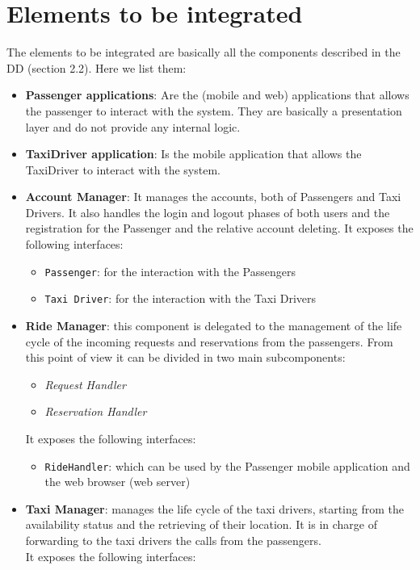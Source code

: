 \section{Elements to be integrated}
The elements to be integrated are basically all the components described in the DD (section 2.2). Here we list them:
\begin{itemize}
	\item \textbf{Passenger applications}: Are the (mobile and web) applications that allows the passenger to interact with the system. They are basically a presentation layer and do not provide any internal logic.
	\item \textbf{TaxiDriver application}: Is the mobile application that allows the TaxiDriver to interact with the system.
	\item \textbf{Account Manager}: It manages the accounts, both of Passengers and Taxi Drivers. It also handles the login and logout phases of both users and the registration for the Passenger and the relative account deleting. It exposes the following interfaces:
	\begin{itemize}
		\item \texttt{Passenger}: for the interaction with the Passengers
		\item \texttt{Taxi Driver}: for the interaction with the Taxi Drivers
	\end{itemize}
	\item \textbf{Ride Manager}: this component is delegated to the management of the life cycle of the incoming requests and reservations from the passengers. From this point of view it can be divided in two main subcomponents:
	\begin{itemize}
		\item \textit{Request Handler}
		\item \textit{Reservation Handler}
	\end{itemize}
	It exposes the following interfaces:
	\begin{itemize}
		\item \texttt{RideHandler}: which can be used by the Passenger mobile application and the web browser (web server)
	\end{itemize}
	\item \textbf{Taxi Manager}: manages the life cycle of the taxi drivers, starting from the availability status and the retrieving of their location. It is in charge of forwarding to the taxi drivers the calls from the passengers.\\ It exposes the following interfaces:

\end{itemize}
